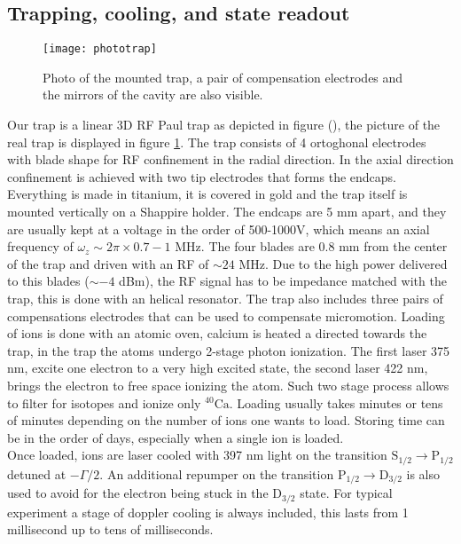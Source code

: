 \subsection{Trapping, cooling, and state readout}
\begin{figure}
\centering
\texttt{[image: phototrap]}
\caption{Photo of the mounted trap, a pair of compensation electrodes and the mirrors of the cavity are also visible.}
\label{trapphoto}
\end{figure}
Our trap is a linear 3D RF Paul trap as depicted in figure (), the picture of the real trap is displayed in figure \ref{trapphoto}. The trap consists of 4 ortoghonal electrodes with blade shape for RF confinement in the radial direction. In the axial direction confinement is achieved with two tip electrodes that forms the endcaps. Everything is made in titanium, it is covered in gold and the trap itself is mounted vertically on a Shappire holder. The endcaps are 5 mm apart, and they are usually kept at a voltage in the order of 500-1000V, which means an axial frequency of $\omega_z \sim 2\pi \times 0.7-1$ MHz. The four blades are 0.8 mm from the center of the trap and driven with an RF of $\sim 24$ MHz. Due to the high power delivered to this blades ($\sim-4$ dBm), the RF signal has to be impedance matched with the trap, this is done with an helical resonator.
The trap also includes three pairs of compensations electrodes that can be used to compensate micromotion.
Loading of ions is done with an atomic oven, calcium is heated a directed towards the trap, in the trap the atoms undergo 2-stage photon ionization. The first laser 375 nm, excite one electron to a very high excited state, the second laser 422 nm, brings the electron to free space ionizing the atom. Such two stage process allows to filter for isotopes and ionize only $^{40}\text{Ca}$. Loading usually takes minutes or tens of minutes depending on the number of ions one wants to load. Storing time can be in the order of days, especially when a single ion is loaded.\\
Once loaded, ions are laser cooled with 397 nm light on the transition $\text{S}_{1/2} \to \text{P}_{1/2}$ detuned at $-\Gamma/2$. An additional repumper on the transition $\text{P}_{1/2} \to \text{D}_{3/2}$ is also used to avoid for the electron being stuck in the $\text{D}_{3/2}$ state. For typical experiment a stage of doppler cooling is always included, this lasts from 1 millisecond up to tens of milliseconds.\\
